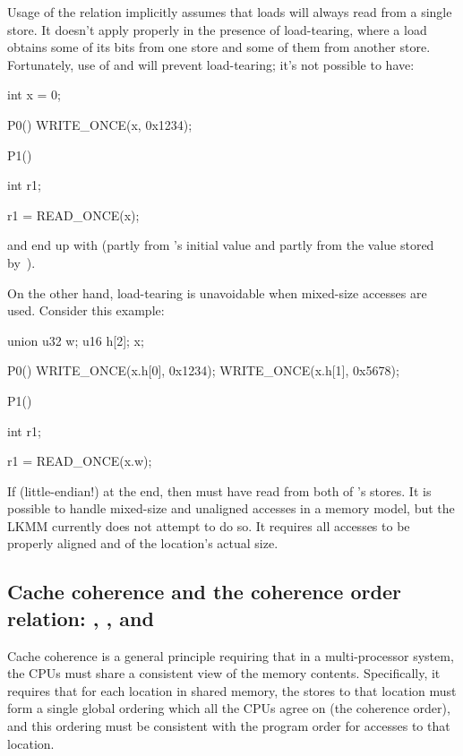 Usage of the  relation implicitly assumes that loads will always
read from a single store.
It doesn't apply properly in the presence of load-tearing, where a
load obtains some of its bits from one store and some of them from
another store.
Fortunately, use of  and  will
prevent load-tearing; it's not possible to have:

\begin{VerbatimU}
	int x = 0;

	P0()
	{
		WRITE_ONCE(x, 0x1234);
	}

	P1()
	{
		int r1;

		r1 = READ_ONCE(x);
	}
\end{VerbatimU}

\noindent%
and end up with  (partly from 's initial value
and partly from the value stored by~).

On the other hand, load-tearing is unavoidable when mixed-size
accesses are used.
Consider this example:

\begin{VerbatimU}
	union {
		u32	w;
		u16	h[2];
	} x;

	P0()
	{
		WRITE_ONCE(x.h[0], 0x1234);
		WRITE_ONCE(x.h[1], 0x5678);
	}

	P1()
	{
		int r1;

		r1 = READ_ONCE(x.w);
	}
\end{VerbatimU}

If  (little-endian{!}) at the end, then 
must have read from both of 's stores.
It is possible to handle mixed-size and unaligned accesses in a memory
model, but the LKMM currently does not attempt to do so.
It requires all accesses to be properly aligned and of the location's
actual size.


\subsection{Cache coherence and the coherence order relation: , , and }
\label{sec:docs:explanation:Cache Coherence and The Coherence Order Relation}

Cache coherence is a general principle requiring that in a
multi-processor system, the CPUs must share a consistent view of the
memory contents.
Specifically, it requires that for each location in shared memory,
the stores to that location must form a single global ordering which
all the CPUs agree on (the coherence order), and this ordering must be
consistent with the program order for accesses to that location.

